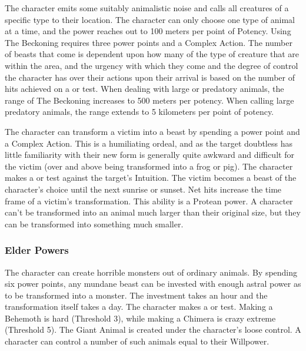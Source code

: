  The character emits some suitably animalistic noise and calls all creatures of a specific type to their location. The character can only choose one type of animal at a time, and the power reaches out to 100 meters per point of Potency. Using The Beckoning requires three power points and a Complex Action. The number of beasts that come is dependent upon how many of the type of creature that are within the area, and the urgency with which they come and the degree of control the character has over their actions upon their arrival is based on the number of hits achieved on a  or  test. When dealing with large or predatory animals, the range of The Beckoning increases to 500 meters per potency. When calling large predatory animals, the range extends to 5 kilometers per point of potency.

 The character can transform a victim into a beast by spending a power point and a Complex Action. This is a humiliating ordeal, and as the target doubtless has little familiarity with their new form is generally quite awkward and difficult for the victim (over and above being transformed into a frog or pig). The character makes a  or  test against the target's Intuition. The victim becomes a beast of the character's choice until the next sunrise or sunset. Net hits increase the time frame of a victim's transformation. This ability is a Protean power. A character can't be transformed into an animal much larger than their original size, but they can be transformed into something much smaller.

\subsubsection{Elder Powers}

 The character can create horrible monsters out of ordinary animals. By spending six power points, any mundane beast can be invested with enough astral power as to be transformed into a monster. The investment takes an hour and the transformation itself takes a day. The character makes a  or  test. Making a Behemoth is hard (Threshold 3), while making a Chimera is crazy extreme (Threshold 5). The Giant Animal is created under the character's loose control. A character can control a number of such animals equal to their Willpower.

